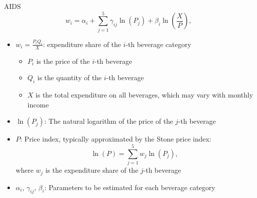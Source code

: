 \documentclass[12pt]{beamer}
\begin{document}
\begin{frame}{AIDS}
\[
	w_i = \alpha_i + \sum_{j=1}^{5} \gamma_{ij} \ln(P_j) + \beta_i \ln\left(\frac{X}{P}\right),
\]
\begin{itemize}
	\item $w_i = \frac{P_i Q_i}{X}$: expenditure share of the $i$-th beverage category
	\begin{itemize}
		\item $P_i$ is the price of the $i$-th beverage
		\item $Q_i$ is the quantity of the $i$-th beverage
		\item $X$ is the total expenditure on all beverages, which may vary with monthly income
	\end{itemize}
	\item $\ln(P_j)$: The natural logarithm of the price of the $j$-th beverage
	\item $P$: Price index, typically approximated by the Stone price index:
	\begin{equation*}
	\ln(P) = \sum_{j=1}^{5} w_j \ln(P_j),
	\end{equation*}
	where $w_j$ is the expenditure share of the $j$-th beverage
	\item $\alpha_i$, $\gamma_{ij}$, $\beta_i$: Parameters to be estimated for each beverage category
\end{itemize}
\end{frame}
\end{document}
